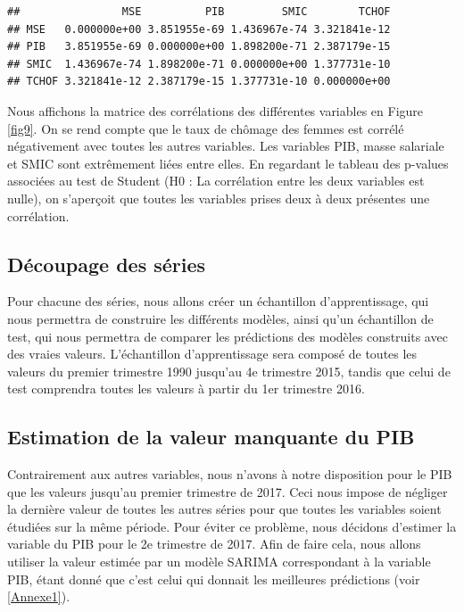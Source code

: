\documentclass[11pt,]{article}
\begin{document}
\begin{verbatim}
##                MSE          PIB         SMIC        TCHOF
## MSE   0.000000e+00 3.851955e-69 1.436967e-74 3.321841e-12
## PIB   3.851955e-69 0.000000e+00 1.898200e-71 2.387179e-15
## SMIC  1.436967e-74 1.898200e-71 0.000000e+00 1.377731e-10
## TCHOF 3.321841e-12 2.387179e-15 1.377731e-10 0.000000e+00
\end{verbatim}

Nous affichons la matrice des corrélations des différentes variables en
Figure \ref{fig9}. On se rend compte que le taux de chômage des femmes
est corrélé négativement avec toutes les autres variables. Les variables
PIB, masse salariale et SMIC sont extrêmement liées entre elles. En
regardant le tableau des p-values associées au test de Student (H0 : La
corrélation entre les deux variables est nulle), on s'aperçoit que
toutes les variables prises deux à deux présentes une corrélation.

\subsection{Découpage des séries}\label{decoupage-des-series}

Pour chacune des séries, nous allons créer un échantillon
d'apprentissage, qui nous permettra de construire les différents
modèles, ainsi qu'un échantillon de test, qui nous permettra de comparer
les prédictions des modèles construits avec des vraies valeurs.
L'échantillon d'apprentissage sera composé de toutes les valeurs du
premier trimestre 1990 jusqu'au 4e trimestre 2015, tandis que celui de
test comprendra toutes les valeurs à partir du 1er trimestre 2016.

\subsection{Estimation de la valeur manquante du
PIB}\label{estimation-de-la-valeur-manquante-du-pib}

Contrairement aux autres variables, nous n'avons à notre disposition
pour le PIB que les valeurs jusqu'au premier trimestre de 2017. Ceci
nous impose de négliger la dernière valeur de toutes les autres séries
pour que toutes les variables soient étudiées sur la même période. Pour
éviter ce problème, nous décidons d'estimer la variable du PIB pour le
2e trimestre de 2017. Afin de faire cela, nous allons utiliser la valeur
estimée par un modèle SARIMA correspondant à la variable PIB, étant
donné que c'est celui qui donnait les meilleures prédictions (voir
\ref{Annexe1}).
\end{document}
